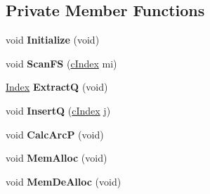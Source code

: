\subsection*{Private Member Functions}
\begin{DoxyCompactItemize}
\item 
\mbox{\label{class_s_p_tree_a7f34e789c6e833bd0e987f5f5cfca365}} 
void {\bfseries Initialize} (void)
\item 
\mbox{\label{class_s_p_tree_a571e6677d1d8624a538f292e456a0259}} 
void {\bfseries Scan\+FS} (\mbox{\hyperlink{class_m_c_f_class_a76aaabb20535c51a2752b93f6c38fe54}{c\+Index}} mi)
\item 
\mbox{\label{class_s_p_tree_af4d837bc73f435f2fa2528677ffc61a7}} 
\mbox{\hyperlink{class_m_c_f_class_ad53d6229d7ec28555a9c9c2fd9abf773}{Index}} {\bfseries ExtractQ} (void)
\item 
\mbox{\label{class_s_p_tree_a150170dce224f299ea5dea91999a8c23}} 
void {\bfseries InsertQ} (\mbox{\hyperlink{class_m_c_f_class_a76aaabb20535c51a2752b93f6c38fe54}{c\+Index}} j)
\item 
\mbox{\label{class_s_p_tree_ac257d612edff13b0bd7caf2758543ba7}} 
void {\bfseries Calc\+ArcP} (void)
\item 
\mbox{\label{class_s_p_tree_a0f5c43a76c4b5140beeaa378a659c772}} 
void {\bfseries Mem\+Alloc} (void)
\item 
\mbox{\label{class_s_p_tree_a203fcfa70e86fa885526ea376b22b54a}} 
void {\bfseries Mem\+De\+Alloc} (void)
\end{DoxyCompactItemize}
